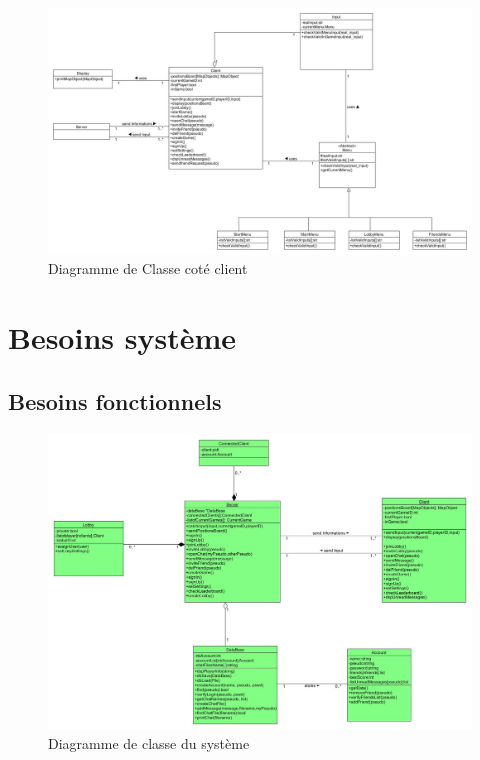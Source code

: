 \documentclass[a4paper,12pt]{article}
\begin{document}
\begin{figure}[hbtp]
\centering
\includegraphics[scale=0.3]{newClientClassDiagram.jpg}
\caption{Diagramme de Classe coté client}
\end{figure}

\newpage

\section{Besoins système}
\subsection{Besoins fonctionnels}

\begin{figure}[h!]
\centering
\includegraphics[width=16cm]{newSystemClassDiagram.jpg}
\caption{Diagramme de classe du système}
\label{fig:UerUseCase}
\end{figure}
\end{document}
